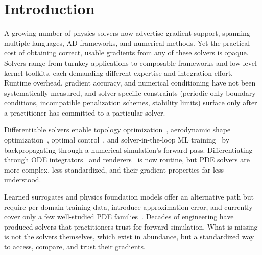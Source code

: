 \documentclass[11pt,a4paper]{article}
\begin{document}
\section{Introduction}
\label{sec:intro}


A growing number of physics solvers now advertise gradient support,
spanning multiple languages, AD frameworks, and numerical methods.
Yet the practical cost of obtaining correct, usable gradients from any
of these solvers is opaque. Solvers range from turnkey applications to
composable frameworks and low-level kernel toolkits, each demanding
different expertise and integration effort. Runtime overhead, gradient accuracy, and numerical conditioning
have not been systematically measured, and solver-specific constraints
(periodic-only boundary conditions,
incompatible penalization schemes, stability limits) surface only after
a practitioner has committed to a particular solver.


Differentiable solvers enable topology
optimization~\cite{bendsoe2003topology}, aerodynamic shape
optimization~\cite{jameson1988aerodynamic}, optimal
control~\cite{bewley2001dns}, and solver-in-the-loop ML
training~\cite{kochkov2021machine, um2020sol} by backpropagating
through a numerical simulation's forward pass.
Differentiating through ODE integrators~\cite{chen2018neural,rackauckas2021universal}
and renderers~\cite{kato2020differentiable} is now routine, but PDE
solvers are more complex, less standardized, and their gradient
properties far less understood.

Learned surrogates and physics foundation models offer an alternative
path but require per-domain training data, introduce approximation
error, and currently cover only a few well-studied PDE
families~\cite{pathak2022fourcastnet, bodnar2024aurora}.
Decades of engineering have produced solvers that practitioners
trust for forward simulation. What is missing is not the solvers
themselves, which exist in abundance, but a standardized way to
access, compare, and trust their gradients.
\end{document}
